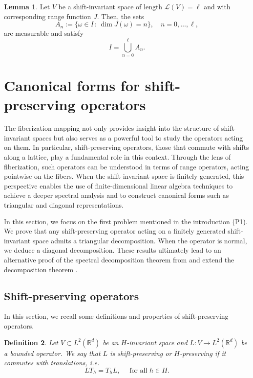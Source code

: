 \documentclass[a4paper,11pt]{amsart}
\newtheorem{fed}{Definition}[section]
\theoremstyle{definition}
\newtheorem{lem}[fed]{Lemma}
\theoremstyle{definition}
\def\w{\omega}
\def\ele{\mathcal{L}}
\begin{document}
	\begin{lem}\label{lem:dimensions}
		Let $V$ be a shift-invariant space of length $\ele(V) = \ell$ and with corresponding range function $J$. Then, the sets
		$$
		A_n := \{\w\in  I\,:\, \dim J(\w) = n\}, \quad n=0, \dots, \ell,
		$$
		are measurable and satisfy 
		$$
		I = \bigcup_{n=0}^{\ell} A_n.
		$$
	\end{lem}
	
	
	\section{Canonical forms for shift-preserving operators}\label{sec-3}
	
	The fiberization mapping not only provides insight into the structure of shift-invariant spaces but also serves as a powerful tool to study the operators acting on them. In particular, shift-preserving operators, those that commute with shifts along a lattice, play a fundamental role in this context. Through the lens of fiberization, such operators can be understood in terms of range operators, acting pointwise on the fibers. When the shift-invariant space is finitely generated, this perspective enables the use of finite-dimensional linear algebra techniques to achieve a deeper spectral analysis and 
	to construct canonical forms such as triangular and diagonal representations.
	
	In this section, we focus on the first problem mentioned in the introduction (P1). We prove that any shift-preserving operator acting on a finitely generated shift-invariant space admits a triangular decomposition. When the operator is normal, we deduce a diagonal decomposition. These results ultimately lead to an alternative proof of the spectral decomposition theorem from \cite{ACCP} and extend the decomposition theorem \cite[Theorem 3.3]{B}. 
	
	
	\subsection{Shift-preserving operators}\label{section-SP}
	
	In this section, we recall some definitions and properties of shift-preserving operators.
	
	\begin{fed}
		Let $V\subset L^2(\mathbb R^d)$ be an $H$-invariant space and $L:V\rightarrow L^2(\mathbb R^d)$ be a bounded operator. We say that $L$ is {\it shift-preserving} or $H$-preserving if it commutes with translations, i.e. $$LT_h = T_h L,\quad\text{ for all }h\in H.$$
	\end{fed}
	
\end{document}
